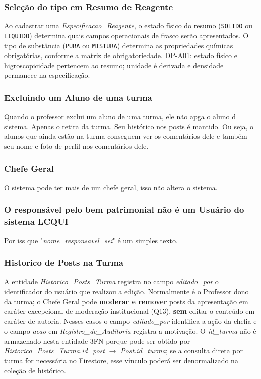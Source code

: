 \subsubsection{Seleção do tipo em Resumo de Reagente}
\begin{regra}
Ao cadastrar uma \textit{Especificacao\_Reagente}, o estado físico do resumo (\texttt{SOLIDO} ou \texttt{LIQUIDO}) determina quais campos operacionais de frasco serão apresentados. O tipo de substância (\texttt{PURA} ou \texttt{MISTURA}) determina as propriedades químicas obrigatórias, conforme a matriz de obrigatoriedade. DP-A01: estado físico e higroscopicidade pertencem ao resumo; unidade é derivada e densidade permanece na especificação. \\
\end{regra}
\subsubsection{Excluindo um Aluno de uma turma}
\begin{regra}
Quando o professor exclui um aluno de uma turma, ele não apga o aluno d sistema. Apenas o retira da turma. Seu histórico nos posts é mantido. Ou seja, o alunos que ainda estão na turma conseguem ver os comentários dele e também seu nome e foto de perfil nos comentários dele.
\end{regra}
\subsubsection{Chefe Geral}
\begin{regra}
O sistema pode ter mais de um chefe geral, isso não altera o sistema.
\end{regra}
\subsubsection{O responsável pelo bem patrimonial não é um Usuário do sistema LCQUI}
\begin{regra}
Por iss que "\textit{nome\_responsavel\_sei}" é um simples texto.
\end{regra}
\subsubsection{Historico de Posts na Turma}
\begin{regra}
A entidade \textit{Historico\_Posts\_Turma} registra no campo \textit{editado\_por} o identificador do usuário que realizou a edição. Normalmente é o Professor dono da turma; o Chefe Geral pode \textbf{moderar e remover} posts da apresentação em caráter excepcional de moderação institucional (Q13), \textbf{sem} editar o conteúdo em caráter de autoria. Nesses casos o campo \textit{editado\_por} identifica a ação da chefia e o campo \textit{acao} em \textit{Registro\_de\_Auditoria} registra a motivação. O \textit{id\_turma} não é armazenado nesta entidade 3FN porque pode ser obtido por \textit{Historico\_Posts\_Turma.id\_post} $\rightarrow$ \textit{Post.id\_turma}; se a consulta direta por turma for necessária no Firestore, esse vínculo poderá ser denormalizado na coleção de histórico.
\end{regra}
